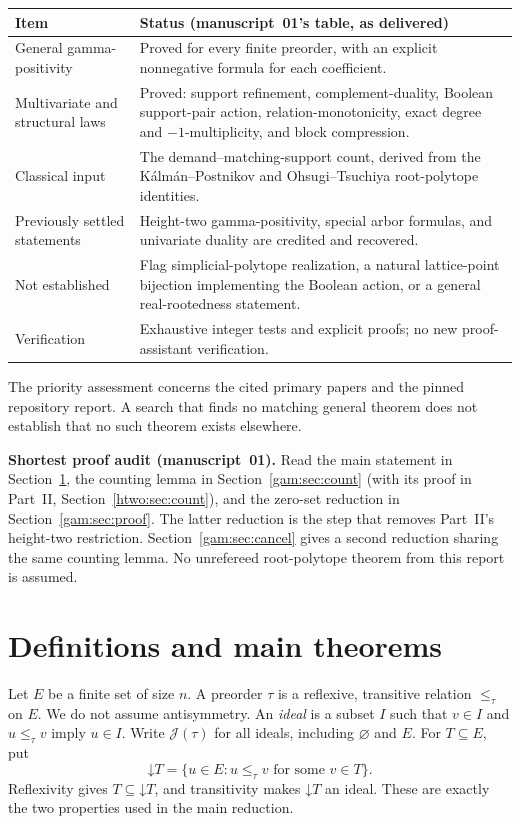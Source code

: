 \documentclass[11pt]{article}
\numberwithin{equation}{section}
\theoremstyle{definition}
\newcommand{\J}{\mathcal J(\tau)}
\newcommand{\down}{\mathord\downarrow}
\begin{document}
\begin{center}
\small
\begin{tabularx}{\textwidth}{@{}p{}Y@{}}
\toprule
Item & Status (manuscript~01's table, as delivered)\\
\midrule
General gamma-positivity & Proved for every finite preorder, with an explicit
nonnegative formula for each coefficient.\\
Multivariate and structural laws & Proved: support refinement, complement-duality,
Boolean support-pair action, relation-monotonicity, exact degree and
$-1$-multiplicity, and block compression.\\
Classical input & The demand--matching-support count, derived from the
K\'alm\'an--Postnikov and Ohsugi--Tsuchiya root-polytope identities.\\
Previously settled statements & Height-two gamma-positivity, special arbor
formulas, and univariate duality are credited and recovered.\\
Not established & Flag simplicial-polytope realization, a natural lattice-point
bijection implementing the Boolean action, or a general real-rootedness
statement.\\
Verification & Exhaustive integer tests and explicit proofs; no new
proof-assistant verification.\\
\bottomrule
\end{tabularx}
\end{center}
The priority assessment concerns the cited primary papers and the pinned
repository report. A search that finds no matching general theorem does not
establish that no such theorem exists elsewhere.

\begin{statusbox}
\small\textbf{Shortest proof audit (manuscript~01).} Read the main statement
in Section~\ref{gam:sec:main}, the counting lemma in
Section~\ref{gam:sec:count} (with its proof in Part~II,
Section~\ref{htwo:sec:count}), and the zero-set reduction in
Section~\ref{gam:sec:proof}. The latter reduction is the step that removes
Part~II's height-two restriction. Section~\ref{gam:sec:cancel} gives a
second reduction sharing the same counting lemma. No unrefereed
root-polytope theorem from this report is assumed.
\end{statusbox}

\section{Definitions and main theorems}\label{gam:sec:main}
Let $E$ be a finite set of size $n$. A preorder $\tau$ is a reflexive,
transitive relation $\le_\tau$ on $E$. We do not assume antisymmetry. An
\emph{ideal} is a subset $I$ such that $v\in I$ and $u\le_\tau v$ imply
$u\in I$. Write $\J$ for all ideals, including $\varnothing$ and $E$.
For $T\subseteq E$, put
\[
 \down T=\{u\in E:u\le_\tau v\text{ for some }v\in T\}.
\]
Reflexivity gives $T\subseteq\down T$, and transitivity makes $\down T$ an
ideal. These are exactly the two properties used in the main reduction.
\end{document}
